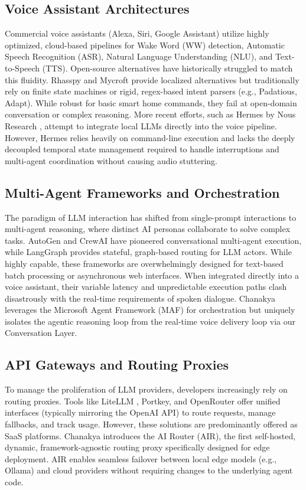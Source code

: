 \documentclass[conference]{IEEEtran}
\begin{document}
\subsection{Voice Assistant Architectures}
Commercial voice assistants (Alexa, Siri, Google Assistant) utilize highly optimized, cloud-based pipelines for Wake Word (WW) detection, Automatic Speech Recognition (ASR), Natural Language Understanding (NLU), and Text-to-Speech (TTS). Open-source alternatives have historically struggled to match this fluidity. Rhasspy and Mycroft \cite{mycroft} provide localized alternatives but traditionally rely on finite state machines or rigid, regex-based intent parsers (e.g., Padatious, Adapt). While robust for basic smart home commands, they fail at open-domain conversation or complex reasoning. More recent efforts, such as Hermes by Nous Research \cite{noushermes}, attempt to integrate local LLMs directly into the voice pipeline. However, Hermes relies heavily on command-line execution and lacks the deeply decoupled temporal state management required to handle interruptions and multi-agent coordination without causing audio stuttering.

\subsection{Multi-Agent Frameworks and Orchestration}
The paradigm of LLM interaction has shifted from single-prompt interactions to multi-agent reasoning, where distinct AI personas collaborate to solve complex tasks. AutoGen \cite{wu2023autogen} and CrewAI \cite{crewai} have pioneered conversational multi-agent execution, while LangGraph \cite{langgraph} provides stateful, graph-based routing for LLM actors. While highly capable, these frameworks are overwhelmingly designed for text-based batch processing or asynchronous web interfaces. When integrated directly into a voice assistant, their variable latency and unpredictable execution paths clash disastrously with the real-time requirements of spoken dialogue. Chanakya leverages the Microsoft Agent Framework (MAF) for orchestration but uniquely isolates the agentic reasoning loop from the real-time voice delivery loop via our Conversation Layer.

\subsection{API Gateways and Routing Proxies}
To manage the proliferation of LLM providers, developers increasingly rely on routing proxies. Tools like LiteLLM \cite{litellm}, Portkey, and OpenRouter \cite{openrouter} offer unified interfaces (typically mirroring the OpenAI API) to route requests, manage fallbacks, and track usage. However, these solutions are predominantly offered as SaaS platforms. Chanakya introduces the AI Router (AIR), the first self-hosted, dynamic, framework-agnostic routing proxy specifically designed for edge deployment. AIR enables seamless failover between local edge models (e.g., Ollama) and cloud providers without requiring changes to the underlying agent code.
\end{document}
